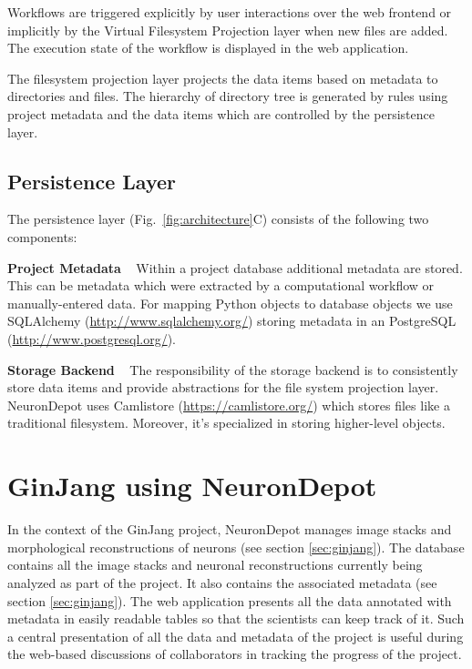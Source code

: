 \documentclass{frontiersSCNS} %
\begin{document}
Workflows are triggered explicitly by user interactions over the web
frontend or implicitly by the Virtual Filesystem Projection layer when new
files are added. The execution state of the workflow is displayed in the web
application.

The filesystem projection layer projects the data items based on metadata to
directories and files. The hierarchy of directory tree is generated by rules
using project metadata and the data items which are controlled by the
persistence layer.

\subsection{Persistence Layer}\label{sec:persistence_layer}

The persistence layer (Fig.~\ref{fig:architecture}C) consists of the following two components:

\textbf{Project Metadata} \texttt{ } Within a project database additional
metadata are stored. This can be metadata which were extracted by a computational
workflow or manually-entered data. For mapping Python objects to database
objects we use SQLAlchemy (\url{http://www.sqlalchemy.org/}) storing metadata
in an PostgreSQL (\url{http://www.postgresql.org/}).

\textbf{Storage Backend} \texttt{ } The responsibility of the storage backend
is to consistently store data items and provide abstractions for the file
system projection layer. NeuronDepot uses Camlistore
(\url{https://camlistore.org/}) which stores files like a traditional
filesystem. Moreover, it's specialized in storing higher-level objects.

\section{GinJang using NeuronDepot}

In the context of the GinJang project, NeuronDepot manages image stacks and
morphological reconstructions of neurons (see section \ref{sec:ginjang}). The
database contains all the image stacks and neuronal reconstructions currently
being analyzed as part of the project. It also contains the associated
metadata (see section \ref{sec:ginjang}). The web application presents all the
data annotated with metadata in easily readable tables so that the scientists
can keep track of it. Such a central presentation of all the data and metadata of
the project is useful during the web-based discussions of collaborators in
tracking the progress of the project.
\end{document}
